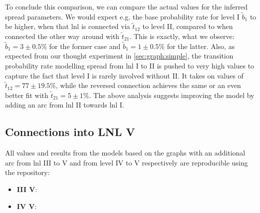 \documentclass[\relativeRoot/main.tex]{subfiles}
\begin{document}
To conclude this comparison, we can compare the actual values for the inferred spread parameters. We would expect e.g. the base probability rate for level I $\tilde{b}_1$ to be higher, when that \gls{lnl} is connected via $\tilde{t}_{12}$ to level II, compared to when connected the other way around with $\tilde{t}_{21}$. This is exactly, what we observe: $\tilde{b}_1 = 3 \pm 0.5 \%$ for the former case and $\tilde{b}_1 = 1 \pm 0.5 \%$ for the latter. Also, as expected from our thought experiment in \cref{sec:graph:simple}, the transition probability rate modelling spread from \gls{lnl} I to II is pushed to very high values to capture the fact that level I is rarely involved without II. It takes on values of $\tilde{t}_{12} = 77 \pm 19.5 \%$, while the reversed connection achieves the same or an even better fit with $\tilde{t}_{21} = 5 \pm 1 \%$. The above analysis suggests improving the model by adding an arc from \gls{lnl} II towards \gls{lnl} I.

\subsection{Connections into LNL V}
\label{subsec:graph:extended:toV}

\begin{tcolorbox}[title=\faIcon{recycle} Reproducibility, parbox=false]
    All values and results from the models based on the graphs with an additional arc from \gls{lnl} III to V and from level IV to V respectively are reproducible using the  repository:

    \begin{itemize}
        \item \textbf{III  V}: 
        \item \textbf{IV  V}: 
    \end{itemize}
\end{tcolorbox}
\end{document}
